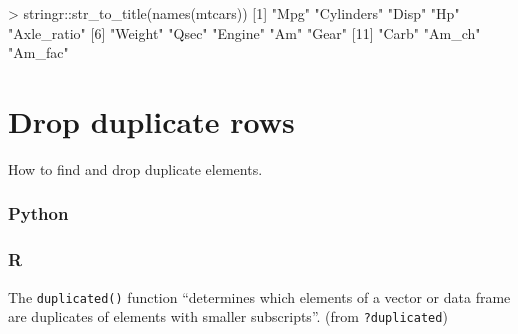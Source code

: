 \documentclass[
]{book}
\newenvironment{Shaded}{\begin{snugshade}}{\end{snugshade}}
\newcommand{\DecValTok}[1]{\textcolor[rgb]{0.00,0.00,0.81}{#1}}
\newcommand{\FunctionTok}[1]{\textcolor[rgb]{0.00,0.00,0.00}{#1}}
\newcommand{\NormalTok}[1]{#1}
\newcommand{\SpecialCharTok}[1]{\textcolor[rgb]{0.00,0.00,0.00}{#1}}
\newcommand{\StringTok}[1]{\textcolor[rgb]{0.31,0.60,0.02}{#1}}
\begin{document}
\begin{Shaded}
\begin{Highlighting}[]
\SpecialCharTok{\textgreater{}}\NormalTok{ stringr}\SpecialCharTok{::}\FunctionTok{str\_to\_title}\NormalTok{(}\FunctionTok{names}\NormalTok{(mtcars))}
\NormalTok{ [}\DecValTok{1}\NormalTok{] }\StringTok{"Mpg"}        \StringTok{"Cylinders"}  \StringTok{"Disp"}       \StringTok{"Hp"}         \StringTok{"Axle\_ratio"}
\NormalTok{ [}\DecValTok{6}\NormalTok{] }\StringTok{"Weight"}     \StringTok{"Qsec"}       \StringTok{"Engine"}     \StringTok{"Am"}         \StringTok{"Gear"}      
\NormalTok{[}\DecValTok{11}\NormalTok{] }\StringTok{"Carb"}       \StringTok{"Am\_ch"}      \StringTok{"Am\_fac"}    
\end{Highlighting}
\end{Shaded}

\hypertarget{drop-duplicate-rows}{%
\section{Drop duplicate rows}\label{drop-duplicate-rows}}

How to find and drop duplicate elements.

\hypertarget{python-21}{%
\subsubsection*{Python}\label{python-21}}

\hypertarget{r-21}{%
\subsubsection*{R}\label{r-21}}

The \texttt{duplicated()} function ``determines which elements of a vector or data frame are duplicates of elements with smaller subscripts''. (from \texttt{?duplicated})
\end{document}
